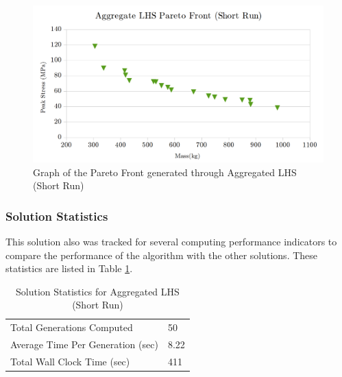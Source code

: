 \begin{figure}[!htbp]
\includegraphics[width=\textwidth]{img/pf_agg_short.png}
\caption{Graph of the Pareto Front generated through Aggregated LHS (Short Run)}
\label{fig:pfront_agg_short}
\end{figure}

\subsubsection{Solution Statistics}
This solution also was tracked for several computing performance indicators to compare the performance of the algorithm with the other solutions. These statistics are listed in Table \ref{tab:stat_agg_short}. 

\begin{table}[!htbp]
  \centering
  \begin{tabular}{|l|l|}
    \hline
	  Total Generations Computed & 50\\
    Average Time Per Generation (sec) & 8.22\\
    Total Wall Clock Time (sec)	 & 411\\
    \hline
  \end{tabular}
\caption{Solution Statistics for Aggregated LHS (Short Run)}
  \label{tab:stat_agg_short}
\end{table}


